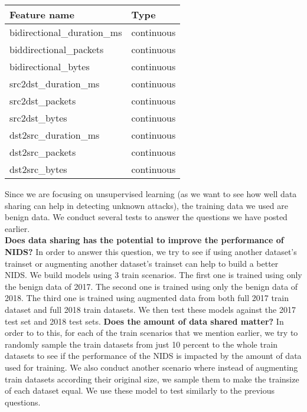 \begin{method}
\begin{table}[!ht]
    \centering
    \begin{tabular}{|l|l|}
    \hline
        Feature name & Type \\ \hline
        bidirectional\_duration\_ms & continuous \\ \hline
        biddirectional\_packets & continuous \\ \hline
        bidirectional\_bytes & continuous \\ \hline
        src2dst\_duration\_ms & continuous \\ \hline
        src2dst\_packets & continuous \\ \hline
        src2dst\_bytes & continuous \\ \hline
        dst2src\_duration\_ms & continuous \\ \hline
        dst2src\_packets & continuous \\ \hline
        dst2src\_bytes & continuous \\ \hline
    \end{tabular}
\end{table}


Since we are focusing on unsupervised learning (as we want to see how well data sharing can help in detecting unknown attacks), the training data we used are benign data. We conduct several tests to answer the questions we have posted earlier. \\
\textbf{Does data sharing has the potential to improve the performance of NIDS?} 
In order to answer this question, we try to see if using another dataset's trainset or augmenting another dataset's trainset can help to build a better NIDS. We build models using 3 train scenarios. The first one is trained using only the benign data of 2017. The second one is trained using only the benign data of 2018. The third one is trained using augmented data from both full 2017 train dataset and full 2018 train datasets. We then test these models against the 2017 test set and 2018 test sets.
\textbf{Does the amount of data shared matter?} 
In order to to this, for each of the train scenarios that we mention earlier, we try to randomly sample the train datasets from just 10 percent to the whole train datasets to see if the performance of the NIDS is impacted by the amount of data used for training. We also conduct another scenario where instead of augmenting train datasets according their original size, we sample them to make the trainsize of each dataset equal. We use these model to test similarly to the previous questions.


\end{method}
